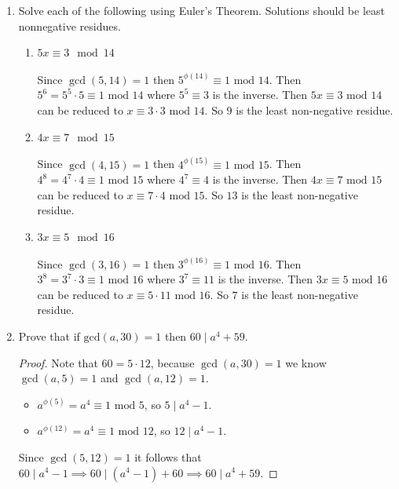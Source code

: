 \documentclass[class=article, crop=false]{standalone}
\begin{document}
\begin{enumerate}
\item
  Solve each of the following using Euler's Theorem.
  Solutions should be least nonnegative residues.
\begin{enumerate}
\item
  $5x\equiv 3\mod 14$\\\\
  Since $\gcd(5,14)=1$ then $5^{\phi(14)}\equiv 1\mbox{ mod }14$.
  Then $5^6 = 5^5 \cdot 5\equiv 1\mbox{ mod }14$ where $5^5\equiv 3$ is the inverse.
  Then $5x\equiv 3\mbox{ mod }14$ can be reduced to $x\equiv 3\cdot 3\mbox{ mod }14$.
  So $9$ is the least non-negative residue.
\item
  $4x\equiv 7\mod 15$\\\\
  Since $\gcd(4,15)=1$ then $4^{\phi(15)}\equiv 1\mbox{ mod }15$.
  Then $4^{8} = 4^7\cdot 4 \equiv 1\mbox{ mod }15$ where $4^7\equiv 4$ is the inverse.
  Then $4x\equiv 7\mbox{ mod }15$ can be reduced to $x\equiv 7\cdot 4\mbox{ mod }15$.
  So $13$ is the least non-negative residue.
\item
  $3x\equiv 5\mod 16$\\\\
  Since $\gcd(3,16)=1$ then $3^{\phi(16)}\equiv 1 \mbox{ mod }16$.
  Then $3^{8} = 3^7 \cdot 3 \equiv 1\mbox{ mod }16$ where $3^7 \equiv 11$ is the inverse.
  Then $3x\equiv 5\mbox{ mod }16$ can be reduced to $x\equiv 5\cdot 11\mbox{ mod }16$.
  So $7$ is the least non-negative residue.
\end{enumerate}

\item
  Prove that if $\text{gcd}(a,30)=1$ then $60\mid a^4+59$.
  \begin{proof}
	Note that $60 = 5\cdot 12$, because $\gcd(a,30)=1$ we know $\gcd(a,5)=1$ and $\gcd(a,12)=1$.
	\begin{itemize}
	  \item $a^{\phi(5)} = a^4 \equiv 1\mbox{ mod }5$, so $5\mid a^4-1$.

	  \item $a^{\phi(12)} = a^4 \equiv 1\mbox{ mod }12$, so $12\mid a^4-1$.
	\end{itemize}
	Since $\gcd(5,12)=1$ it follows that $60\mid a^4 -1 \implies 60\mid (a^4 -1)+60 \implies 60\mid a^4 +59$.
  \end{proof}

\end{enumerate}

\setcounter{subsection}{6}
\end{document}
